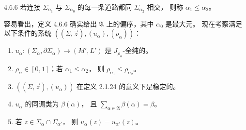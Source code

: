 \begin{definition}{4.6.6}\label{def:4-6-6}
若连接 $\Sigma_{\alpha_1}$ 与 $\Sigma_{\alpha_0}$
的每一条道路都同 $\Sigma_{\alpha_2}$ 相交，
则称 $\alpha_1\le\alpha_2$。
\end{definition}
容易看出，定义 4.6.6 确实给出
$\mathfrak A$ 上的偏序，其中 $\alpha_0$ 是最大元。
现在考察满足以下条件的系统
$((\Sigma,\vec z),(u_\alpha),(\rho_\alpha))$：
\begin{enumerate}[label=\textup{(4.6.7.\arabic*)},leftmargin=5.9em]
 \item
 $u_\alpha\colon(\Sigma_\alpha,\partial\Sigma_\alpha)
 \to(M',L')$ 是 $J_{\rho_\alpha}$-全纯的。
 \item
 $\rho_\alpha\in[0,1]$；若 $\alpha_1\le\alpha_2$，
 则 $\rho_{\alpha_1}\le\rho_{\alpha_2}$。
 \item
 $((\Sigma,\vec z),(u_\alpha))$
 在定义 2.1.24 的意义下是稳定的。
 \item
 $u_\alpha$ 的同调类为 $\beta(\alpha)$，
 且 $\sum_{\alpha\in\mathfrak A}\beta(\alpha)=\beta$。
 \item
 若 $z\in\Sigma_\alpha\cap\Sigma_{\alpha'}$，
 则 $u_\alpha(z)=u_{\alpha'}(z)$。
\end{enumerate}

